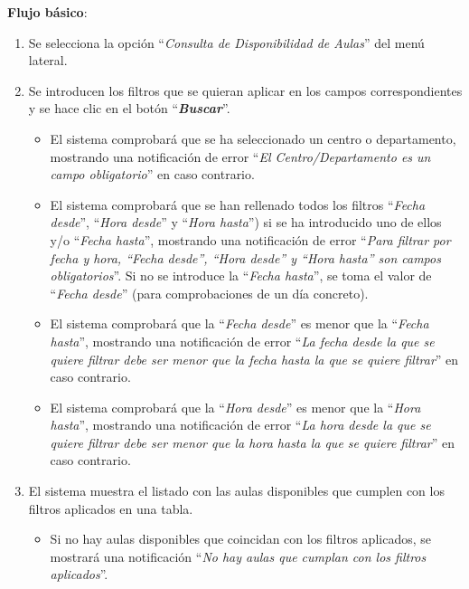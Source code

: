 \textbf{Flujo básico}:
    \begin{enumerate}
        \item Se selecciona la opción ``\textit{Consulta de Disponibilidad de Aulas}'' del menú lateral.
        
        \item Se introducen los filtros que se quieran aplicar en los campos correspondientes y se hace clic en el botón ``\textbf{\textit{Buscar}}''.
            \begin{itemize}
            \tightlist
                \item El sistema comprobará que se ha seleccionado un centro o departamento, mostrando una notificación de error ``\textit{El Centro/Departamento es un campo obligatorio}'' en caso contrario.
                
                \item El sistema comprobará que se han rellenado todos los filtros ``\textit{Fecha desde}'', ``\textit{Hora desde}'' y ``\textit{Hora hasta}'') si se ha introducido uno de ellos y/o ``\textit{Fecha hasta}'', mostrando una notificación de error ``\textit{Para filtrar por fecha y hora, ``Fecha desde'', ``Hora desde'' y ``Hora hasta'' son campos obligatorios}''. Si no se introduce la ``\textit{Fecha hasta}'', se toma el valor de ``\textit{Fecha desde}'' (para comprobaciones de un día concreto).
                
                \item El sistema comprobará que la ``\textit{Fecha desde}'' es menor que la ``\textit{Fecha hasta}'', mostrando una notificación de error ``\textit{La fecha desde la que se quiere filtrar debe ser menor que la fecha hasta la que se quiere filtrar}'' en caso contrario.
                
                \item El sistema comprobará que la ``\textit{Hora desde}'' es menor que la ``\textit{Hora hasta}'', mostrando una notificación de error ``\textit{La hora desde la que se quiere filtrar debe ser menor que la hora hasta la que se quiere filtrar}'' en caso contrario.
            \end{itemize}
            
        \item El sistema muestra el listado con las aulas disponibles que cumplen con los filtros aplicados en una tabla.
            \begin{itemize}
            \tightlist
                \item Si no hay aulas disponibles que coincidan con los filtros aplicados, se mostrará una notificación ``\textit{No hay aulas que cumplan con los filtros aplicados}''.
                

\end{itemize}
\end{enumerate}
